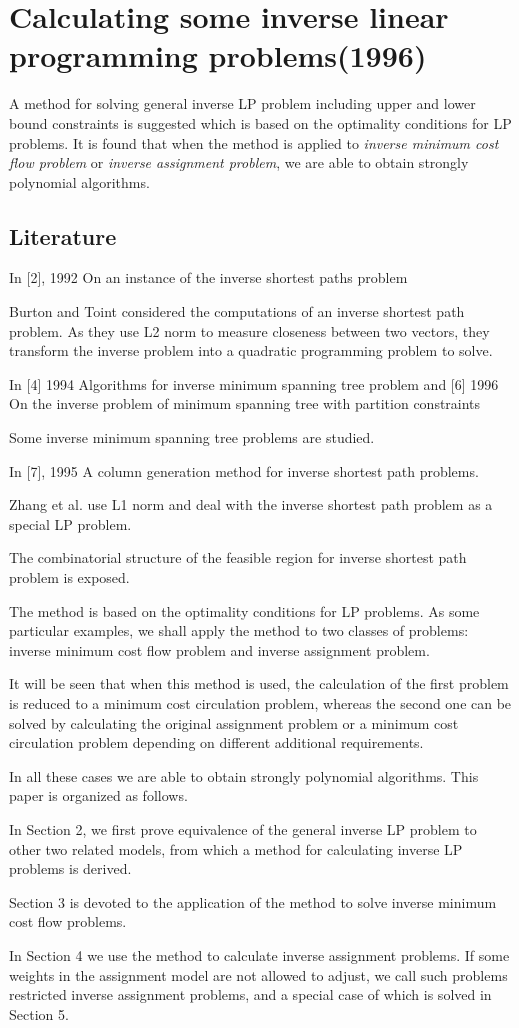 \documentclass[UTF8]{article}
\begin{document}
\section{Calculating some inverse linear programming problems(1996)}

A method for solving general inverse LP problem including upper and lower bound constraints is suggested which is based on the optimality conditions for LP problems. It is found that when the method is applied to \emph{inverse minimum cost flow problem} or \emph{inverse assignment problem}, we are able to obtain strongly polynomial algorithms.


\subsection{Literature}

In [2], 1992 On an instance of the inverse shortest paths problem

Burton and Toint considered the computations of an inverse shortest path problem. As they use L2 norm to measure closeness between two vectors, they transform the inverse problem into a quadratic programming problem to solve.

In [4] 1994 Algorithms for inverse minimum spanning tree problem
and [6] 1996 On the inverse problem of minimum spanning tree with partition constraints

Some inverse minimum spanning tree problems are studied.

In [7], 1995 A column generation method for inverse shortest path problems.

Zhang et al. use L1 norm and deal with the inverse shortest path problem as a special LP problem.

The combinatorial structure of the feasible region for inverse shortest path problem is exposed.


The method is based on the optimality conditions for LP problems. As some particular examples, we shall apply the method to two classes of problems: inverse minimum cost flow problem and inverse assignment problem.

It will be seen that when this method is used, the calculation of the first problem is reduced to a minimum cost circulation problem, whereas the second one can be solved by calculating the original assignment problem or a minimum cost circulation problem depending on different additional requirements.

In all these cases we are able to obtain strongly polynomial algorithms. This paper is organized as follows.

In Section 2, we first prove equivalence of the general inverse LP problem to other two related models, from which a method for calculating inverse LP problems is derived.

Section 3 is devoted to the application of the method to solve inverse minimum cost flow problems.

In Section 4 we use the method to calculate inverse assignment problems. If some weights in the assignment model are not allowed to adjust, we call such problems restricted inverse assignment problems, and a special case of which is solved in Section 5.
\end{document}
